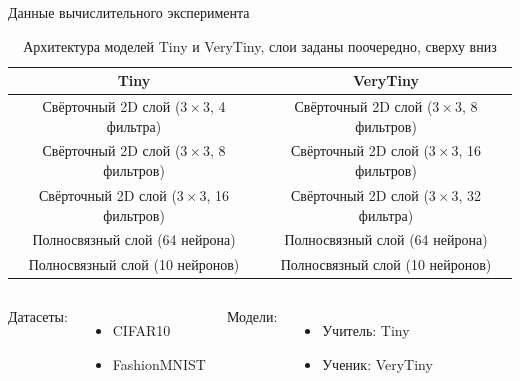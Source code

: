 \documentclass{beamer}
\begin{document}
\begin{frame}{Данные вычислительного эксперимента}
    \begin{table}[h!]
        \centering
        \begin{adjustbox}{max width=\textwidth}
            \begin{tabular}{|c|c|}
                \hline
                Tiny                                                  & VeryTiny                                              \\
                \hline \hline
                Свёрточный 2D слой \break ($3 \times 3$, 4 фильтра)   & Свёрточный 2D слой \break ($3 \times 3$, 8 фильтров)  \\ \hline
                Свёрточный 2D слой \break ($3 \times 3$, 8 фильтров)  & Свёрточный 2D слой \break ($3 \times 3$, 16 фильтров) \\ \hline
                Свёрточный 2D слой \break ($3 \times 3$, 16 фильтров) & Свёрточный 2D слой \break ($3 \times 3$, 32 фильтра)  \\ \hline
                Полносвязный слой  \break (64 нейрона)                & Полносвязный слой \break (64 нейрона)                 \\ \hline
                Полносвязный слой  \break (10 нейронов)               & Полносвязный слой \break (10 нейронов)                \\ \hline
            \end{tabular}
        \end{adjustbox}
        \caption*{Архитектура моделей Tiny и VeryTiny, слои заданы поочередно, сверху вниз}
        \label{table:model_scheme}
    \end{table}
    \begin{columns}[c]
        Датасеты:
        \begin{itemize}
            \item CIFAR10
            \item FashionMNIST
        \end{itemize}
        Модели:
        \begin{itemize}
            \item Учитель: Tiny
            \item Ученик: VeryTiny
        \end{itemize}
    \end{columns}

\end{frame}
\end{document}
